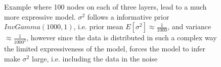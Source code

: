 \begin{figure}[h]
\begin{minipage}[b]{0.49\textwidth}
     \end{minipage}
     \caption{Example where 100 nodes on each of three layers, lead to a much more expressive model.
     $\sigma^2$ follows a informative prior $InvGamma(1000,1)$, i.e. prior mean $E[\sigma^2] \approx
     \frac{1}{1000}$, and variance $\approx \frac{1}{1000^3}$, however since the data is distributed in such 
     a complex way the limited expressiveness of the model, forces the model to infer make $\sigma^2$ large, 
     i.e. including the data in the noise}
\end{figure}




